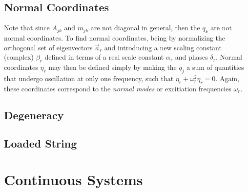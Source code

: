 \subsection{Normal Coordinates}
Note that since $A_{jk}$ and $m_{jk}$ are not diagonal in general, then the $q_k$ are not normal coordinates. To find normal coordinates, being by normalizing the orthogonal set of eigenvectors $\vec{a}_r$ and introducing a new scaling constant (complex) $\beta_r$ defined in terms of a real scale constant $\alpha_r$ and phases $\delta_r$. 
Normal coordinates $\eta_r$ may then be defined simply by making the $q_j$ a sum of quantities that undergo oscillation at only one frequency, such that $\ddot{\eta}_r + \omega_r^2 \eta_r = 0$. Again, these coordinates correspond to the \textit{normal modes} or excitiation frequencies $\omega_r$.

\subsection{Degeneracy}

\subsection{Loaded String}




\newpage
\section{Continuous Systems}
\label{sec:cm-continuous}




